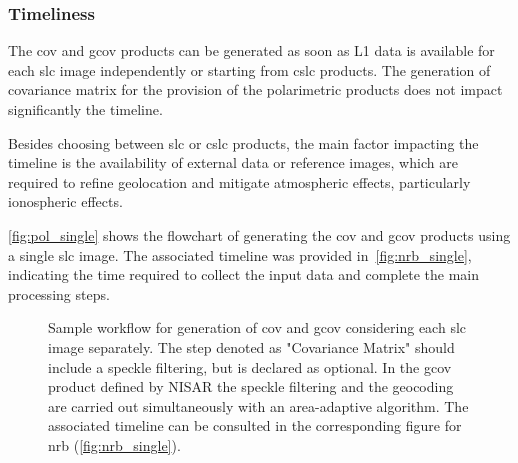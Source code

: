 \subsubsection{Timeliness}

The \acs{cov} and \acs{gcov} products can be generated as soon as L1 data is available for each \acs{slc} image independently or starting from \acs{cslc} products. The generation of covariance matrix for the provision of the polarimetric products does not impact significantly the timeline. 

Besides choosing between \acs{slc} or \acs{cslc} products, the main factor impacting the timeline is the availability of external data or reference images, which are required to refine geolocation and mitigate atmospheric effects, particularly ionospheric effects. 


\autoref{fig:pol_single} shows the flowchart of generating the \acs{cov} and \acs{gcov} products using a single \acs{slc} image. The associated timeline was provided in~\autoref{fig:nrb_single}, indicating the time required to collect the input data and complete the main processing steps. 

\begin{figure}[H]
	\centering
	\caption{Sample workflow for generation of \acs{cov} and \acs{gcov} considering each \acs{slc} image separately. The step denoted as "Covariance Matrix" should include a speckle filtering, but is declared as optional. In the \acs{gcov} product defined by NISAR the speckle filtering and the geocoding are carried out simultaneously with an area-adaptive algorithm. The associated timeline can be consulted in the corresponding figure for \acs{nrb} (\autoref{fig:nrb_single}).}
	\label{fig:pol_single}
\end{figure}


